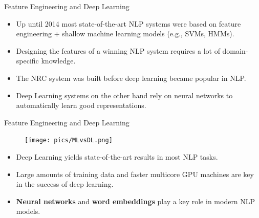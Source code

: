 \documentclass[handout]{beamer}
\begin{document}
\begin{frame}{Feature Engineering and Deep Learning}
\begin{scriptsize}
\begin{itemize}
\item Up until 2014 most state-of-the-art NLP systems were based on feature engineering + shallow machine learning models (e.g., SVMs, HMMs).
\item Designing the features of a winning NLP system requires a lot of domain-specific knowledge.
\item The NRC system was built before deep learning became popular in NLP.
\item Deep Learning systems on the other hand rely on neural networks to automatically learn good representations.
\end{itemize}
\end{scriptsize}





\end{frame}


\begin{frame}{Feature Engineering and Deep Learning}

      \begin{figure}[h]
        	\texttt{[image: pics/MLvsDL.png]}
        \end{figure} 

\begin{scriptsize}
\begin{itemize}
\item Deep Learning yields state-of-the-art results in most NLP tasks. 
\item Large amounts of training data and faster multicore GPU machines are key in the success of deep learning. 
\item \textbf{Neural networks} and \textbf{word embeddings} play a key role in modern NLP models.
\end{itemize}
\end{scriptsize}
\end{frame}
\end{document}
